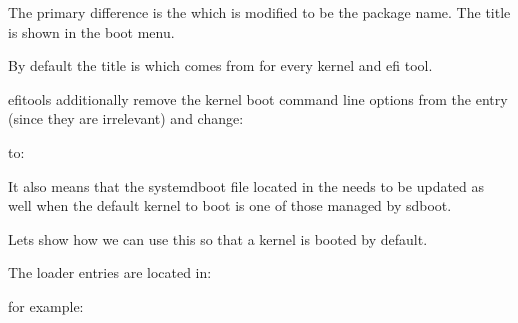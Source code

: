 \documentclass[letterpaper,11pt,english]{sphinxmanual}
\begin{document}
\sphinxAtStartPar
The primary difference is the  which is modified to be the package name.
The title is shown in the boot menu.

\sphinxAtStartPar
By default the title is  which comes from  for every
kernel and efi tool.

\sphinxAtStartPar
efi\sphinxhyphen{}tools additionally remove the kernel boot command line options from the entry
(since they are irrelevant) and change:

\begin{sphinxVerbatim}[commandchars=\\\{\}]
 
\end{sphinxVerbatim}

\sphinxAtStartPar
to:

\begin{sphinxVerbatim}[commandchars=\\\{\}]
 
\end{sphinxVerbatim}

\sphinxAtStartPar
It also means that the systemd\sphinxhyphen{}boot  file located in the 
needs to be updated as well when the default kernel to boot is one of those managed by sd\sphinxhyphen{}boot.

\sphinxAtStartPar
Lets show how we can use this so that a  kernel is booted by default.

\sphinxAtStartPar
The loader entries are located in:

\begin{sphinxVerbatim}[commandchars=\\\{\}]
\end{sphinxVerbatim}

\sphinxAtStartPar
for example:

\begin{sphinxVerbatim}[commandchars=\\\{\}]
\end{sphinxVerbatim}
\end{document}
